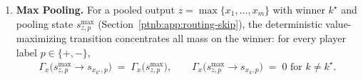 \begin{theoremenv}
\begin{enumerate}
        \begin{align}
            \Gamma_x\!\bigl(s^{\mathrm{add}}_{z,p}\to s_{x_{\mathrm{op}},p}\bigr) \;=\;
            \tfrac12\,\Gamma_x\!\bigl(s^{\mathrm{add}}_{z,p}\bigr),
            \qquad
            \Gamma_x\!\bigl(s^{\mathrm{add}}_{z,p}\to s_{y_{\mathrm{op}},p}\bigr) \;=\;
            \tfrac12\,\Gamma_x\!\bigl(s^{\mathrm{add}}_{z,p}\bigr),
        \end{align}
        so the operand pair carries the full addition-state mass with no duplication.
    \item \textbf{Max Pooling.} For a pooled output $z = \max\{x_1,\dots,x_m\}$ with winner $k^\star$ and
        pooling state $s_{z,p}^{\max}$ (Section~\ref{ptnb:app:routing-skip}), the deterministic
        value-maximizing transition concentrates all mass on the winner: for every player label $p \in
            \{+,-\}$,
        \begin{align}
            \Gamma_x\!\bigl(s^{\max}_{z,p}\to s_{x_{k^\star},p}\bigr) \;=\;
            \Gamma_x\!\bigl(s_{z,p}^{\max}\bigr),
            \qquad
            \Gamma_x\!\bigl(s^{\max}_{z,p}\to s_{x_{k},p}\bigr) \;=\; 0 \text{ for } k \neq k^\star.
        \end{align}
\end{enumerate}
\hfill{}
\end{theoremenv}

